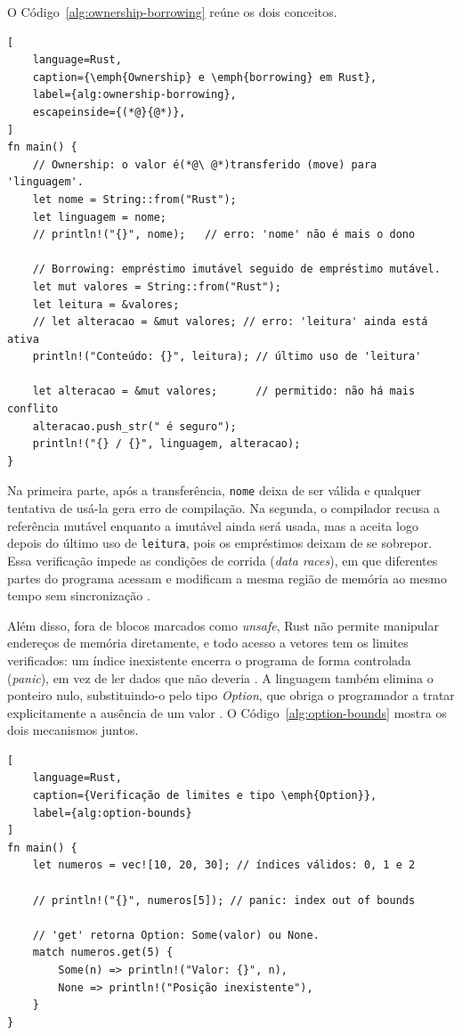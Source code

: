 O Código~\ref{alg:ownership-borrowing} reúne os dois conceitos.

\begin{lstlisting}[
    language=Rust,
    caption={\emph{Ownership} e \emph{borrowing} em Rust},
    label={alg:ownership-borrowing},
    escapeinside={(*@}{@*)},
]
fn main() {
    // Ownership: o valor é(*@\ @*)transferido (move) para 'linguagem'.
    let nome = String::from("Rust");
    let linguagem = nome;
    // println!("{}", nome);   // erro: 'nome' não é mais o dono

    // Borrowing: empréstimo imutável seguido de empréstimo mutável.
    let mut valores = String::from("Rust");
    let leitura = &valores;
    // let alteracao = &mut valores; // erro: 'leitura' ainda está ativa
    println!("Conteúdo: {}", leitura); // último uso de 'leitura'

    let alteracao = &mut valores;      // permitido: não há mais conflito
    alteracao.push_str(" é seguro");
    println!("{} / {}", linguagem, alteracao);
}
\end{lstlisting}

Na primeira parte, após a transferência, \texttt{nome} deixa de ser válida e qualquer tentativa de usá-la gera erro de compilação. Na segunda, o compilador recusa a referência mutável enquanto a imutável ainda será usada, mas a aceita logo depois do último uso de \texttt{leitura}, pois os empréstimos deixam de se sobrepor. Essa verificação impede as condições de corrida (\emph{data races}), em que diferentes partes do programa acessam e modificam a mesma região de memória ao mesmo tempo sem sincronização \cite{bugden2022}.

Além disso, fora de blocos marcados como \emph{unsafe}, Rust não permite manipular endereços de memória diretamente, e todo acesso a vetores tem os limites verificados: um índice inexistente encerra o programa de forma controlada (\emph{panic}), em vez de ler dados que não deveria \cite{bugden2022}. A linguagem também elimina o ponteiro nulo, substituindo-o pelo tipo \emph{Option}, que obriga o programador a tratar explicitamente a ausência de um valor \cite{bugden2022}. O Código~\ref{alg:option-bounds} mostra os dois mecanismos juntos.

\begin{lstlisting}[
    language=Rust,
    caption={Verificação de limites e tipo \emph{Option}},
    label={alg:option-bounds}
]
fn main() {
    let numeros = vec![10, 20, 30]; // índices válidos: 0, 1 e 2

    // println!("{}", numeros[5]); // panic: index out of bounds

    // 'get' retorna Option: Some(valor) ou None.
    match numeros.get(5) {
        Some(n) => println!("Valor: {}", n),
        None => println!("Posição inexistente"),
    }
}
\end{lstlisting}

